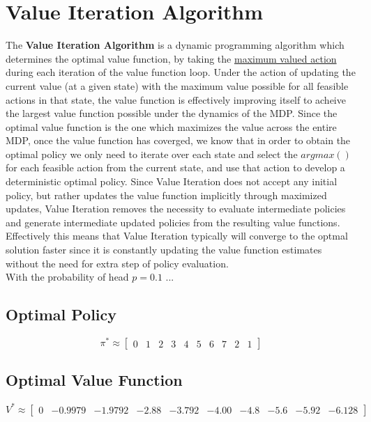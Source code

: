 \documentclass[12pt]{article}
\begin{document}
\section*{Value Iteration Algorithm }

The \textbf{Value Iteration Algorithm} is a dynamic programming algorithm which determines the optimal value function, by taking the \underline{maximum valued action} during each iteration of the value function loop. Under the action of updating the current value (at a given state) with the maximum value possible for all feasible actions in that state, the value function is effectively improving itself to acheive the largest value function possible under the dynamics of the MDP. Since the optimal value function is the one which maximizes the value across the entire MDP, once the value function has coverged, we know that in order to obtain the optimal policy we only need to iterate over each state and select the $argmax()$ for each feasible action from the current state, and use that action to develop a deterministic optimal policy. Since Value Iteration does not accept any initial policy, but rather updates the value function implicitly through maximized updates, Value Iteration removes the necessity to evaluate intermediate policies and generate intermediate updated policies from the resulting value functions. Effectively this means that Value Iteration typically will converge to the optmal solution faster since it is constantly updating the value function estimates without the need for extra step of policy evaluation. \\

With the probability of head $p = 0.1$ ...

\subsection*{Optimal Policy }

$$
\pi^{*} \approx \begin{bmatrix}
    0 & 1 & 2 & 3 & 4 & 5 & 6 & 7 & 2 & 1
\end{bmatrix}
$$

\subsection*{Optimal Value Function}


$$
V^{*} \approx \begin{bmatrix}
    0 & -0.9979 & -1.9792 & -2.88 & -3.792 & -4.00 & -4.8 & -5.6 & -5.92 & -6.128
\end{bmatrix}
$$
\end{document}
